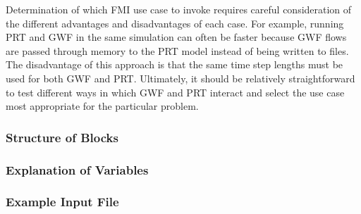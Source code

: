 \noindent Determination of which FMI use case to invoke requires careful consideration of the different advantages and disadvantages of each case.  For example, running PRT and GWF in the same simulation can often be faster because GWF flows are passed through memory to the PRT model instead of being written to files.  The disadvantage of this approach is that the same time step lengths must be used for both GWF and PRT.  Ultimately, it should be relatively straightforward to test different ways in which GWF and PRT interact and select the use case most appropriate for the particular problem. 

\vspace{5mm}
\subsubsection{Structure of Blocks}


\vspace{5mm}
\subsubsection{Explanation of Variables}
\begin{description}

\end{description}

\vspace{5mm}
\subsubsection{Example Input File}


